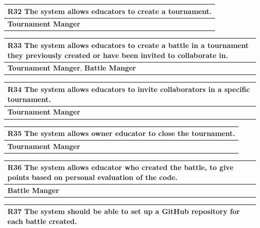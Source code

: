 \documentclass[12pt, a4paper]{report}
\begin{document}
\begin{table}[H]
    \begin{tabularx}{\textwidth}{X}
    \textbf{R32} The system allows educators to create a tournament. \\
    \hline 
    \textbf{Tournament Manger}
    \end{tabularx}
\end{table}

\begin{table}[H]
    \begin{tabularx}{\textwidth}{X}
    \textbf{R33} The system allows educators to create a battle in a tournament they
    previously created or have been invited to collaborate in.\\
    \hline 
    \textbf{Tournament Manger}, \textbf{Battle Manger} 
    \end{tabularx}
\end{table}

\begin{table}[H]
    \begin{tabularx}{\textwidth}{X}
    \textbf{R34} The system allows educators to invite collaborators in a specific tournament.\\
    \hline 
    \textbf{Tournament Manger}
    \end{tabularx}
\end{table}

\begin{table}[H]
    \begin{tabularx}{\textwidth}{X}
    \textbf{R35} The system allows owner educator to close the tournament.\\
    \hline 
    \textbf{Tournament Manger}
    \end{tabularx}
\end{table}

\begin{table}[H]
    \begin{tabularx}{\textwidth}{X}
    \textbf{R36} The system allows educator who created the battle, to give points based
    on personal evaluation of the code.\\
    \hline 
    \textbf{Battle Manger}
    \end{tabularx}
\end{table}

\begin{table}[H]
    \begin{tabularx}{\textwidth}{X}
    \textbf{R37} The system should be able to set up a GitHub repository for each battle
    created.\\
    \hline 
    \end{tabularx}
\end{table}
\end{document}
